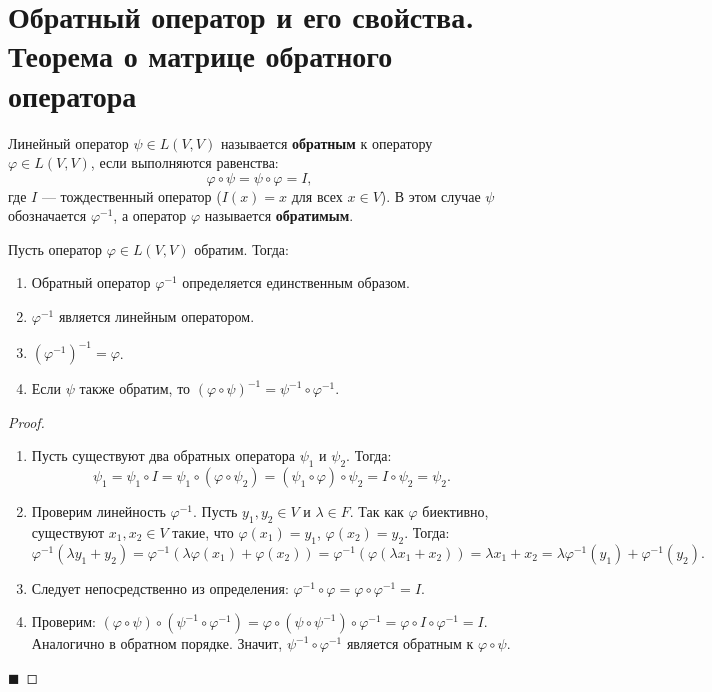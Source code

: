 \section{Обратный оператор и его свойства. Теорема о матрице обратного оператора}

\begin{definition}
Линейный оператор $\psi \in L(V, V)$ называется \textbf{обратным} к оператору $\varphi \in L(V, V)$, если выполняются равенства:
\[
\varphi \circ \psi = \psi \circ \varphi = I,
\]
где $I$ --- тождественный оператор ($I(x) = x$ для всех $x \in V$). В этом случае $\psi$ обозначается $\varphi^{-1}$, а оператор $\varphi$ называется \textbf{обратимым}.
\end{definition}

\begin{theorem}
Пусть оператор $\varphi \in L(V, V)$ обратим. Тогда:
\begin{enumerate}
    \item Обратный оператор $\varphi^{-1}$ определяется единственным образом.
    \item $\varphi^{-1}$ является линейным оператором.
    \item $(\varphi^{-1})^{-1} = \varphi$.
    \item Если $\psi$ также обратим, то $(\varphi \circ \psi)^{-1} = \psi^{-1} \circ \varphi^{-1}$.
\end{enumerate}
\end{theorem}

\begin{proof}
\begin{enumerate}
    \item Пусть существуют два обратных оператора $\psi_1$ и $\psi_2$. Тогда:
    \[
    \psi_1 = \psi_1 \circ I = \psi_1 \circ (\varphi \circ \psi_2) = (\psi_1 \circ \varphi) \circ \psi_2 = I \circ \psi_2 = \psi_2.
    \]
    \item Проверим линейность $\varphi^{-1}$. Пусть $y_1, y_2 \in V$ и $\lambda \in F$. Так как $\varphi$ биективно, существуют $x_1, x_2 \in V$ такие, что $\varphi(x_1) = y_1$, $\varphi(x_2) = y_2$. Тогда:
    \[
    \varphi^{-1}(\lambda y_1 + y_2) = \varphi^{-1}(\lambda \varphi(x_1) + \varphi(x_2)) = \varphi^{-1}(\varphi(\lambda x_1 + x_2)) = \lambda x_1 + x_2 = \lambda \varphi^{-1}(y_1) + \varphi^{-1}(y_2).
    \]
    \item Следует непосредственно из определения: $\varphi^{-1} \circ \varphi = \varphi \circ \varphi^{-1} = I$.
    \item Проверим: $(\varphi \circ \psi) \circ (\psi^{-1} \circ \varphi^{-1}) = \varphi \circ (\psi \circ \psi^{-1}) \circ \varphi^{-1} = \varphi \circ I \circ \varphi^{-1} = I$. Аналогично в обратном порядке. Значит, $\psi^{-1} \circ \varphi^{-1}$ является обратным к $\varphi \circ \psi$.
\end{enumerate}
\hfill$\blacksquare$
\end{proof}

